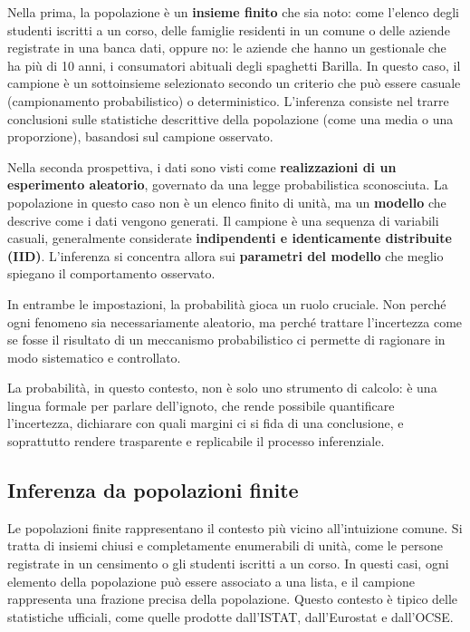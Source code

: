 \documentclass[
  11pt,
]{book}
\theoremstyle{mytheoremstyle}
\theoremstyle{mydefstyle}
\begin{document}
Nella prima, la popolazione è un \textbf{insieme finito} che sia noto: come l'elenco degli studenti iscritti a un corso, delle famiglie residenti in un comune o delle aziende registrate in una banca dati, oppure no: le aziende che hanno un gestionale che ha più di 10 anni, i consumatori abituali degli spaghetti Barilla. In questo caso, il campione è un sottoinsieme selezionato secondo un criterio che può essere casuale (campionamento probabilistico) o deterministico. L'inferenza consiste nel trarre conclusioni sulle statistiche descrittive della popolazione (come una media o una proporzione), basandosi sul campione osservato.

Nella seconda prospettiva, i dati sono visti come \textbf{realizzazioni di un esperimento aleatorio}, governato da una legge probabilistica sconosciuta. La popolazione in questo caso non è un elenco finito di unità, ma un \textbf{modello} che descrive come i dati vengono generati. Il campione è una sequenza di variabili casuali, generalmente considerate \textbf{indipendenti e identicamente distribuite (IID)}. L'inferenza si concentra allora sui \textbf{parametri del modello} che meglio spiegano il comportamento osservato.

In entrambe le impostazioni, la probabilità gioca un ruolo cruciale. Non perché ogni fenomeno sia necessariamente aleatorio, ma perché trattare l'incertezza come se fosse il risultato di un meccanismo probabilistico ci permette di ragionare in modo sistematico e controllato.

La probabilità, in questo contesto, non è solo uno strumento di calcolo: è una lingua formale per parlare dell'ignoto, che rende possibile quantificare l'incertezza, dichiarare con quali margini ci si fida di una conclusione, e soprattutto rendere trasparente e replicabile il processo inferenziale.

\subsection{Inferenza da popolazioni finite}\label{inferenza-da-popolazioni-finite}

Le popolazioni finite rappresentano il contesto più vicino all'intuizione comune. Si tratta di insiemi chiusi e completamente enumerabili di unità, come le persone registrate in un censimento o gli studenti iscritti a un corso. In questi casi, ogni elemento della popolazione può essere associato a una lista, e il campione rappresenta una frazione precisa della popolazione. Questo contesto è tipico delle statistiche ufficiali, come quelle prodotte dall'ISTAT, dall'Eurostat e dall'OCSE.
\end{document}
